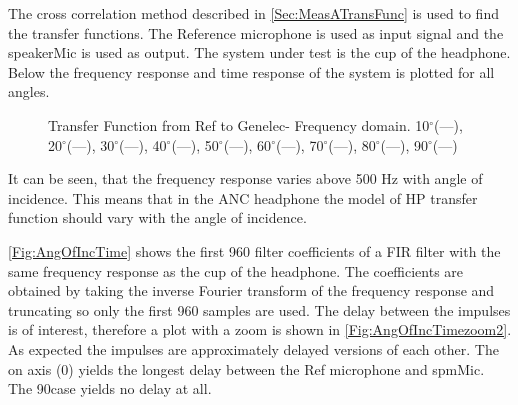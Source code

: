 The cross correlation method described in \autoref{Sec:MeasATransFunc} is used to find the transfer functions. The Reference microphone is used as input signal and the speakerMic is used as output. The system under test is the cup of the headphone. 
Below the frequency response and time response of the system is plotted for all angles. 
\begin{figure}[H]
	
	\caption{Transfer Function from Ref to Genelec- Frequency domain. 10$^\circ$(\textcolor{MATLABblue}{---}), 
	20$^\circ$(\textcolor{MATLABorange}{---}), 	
	30$^\circ$(\textcolor{MATLAByellow}{---}), 	
	40$^\circ$(\textcolor{MATLABpurple}{---}), 	
	50$^\circ$(\textcolor{MATLABgreen}{---}), 	
	60$^\circ$(\textcolor{MATLABbabyblue}{---}), 	
	70$^\circ$(\textcolor{MATLABred}{---}), 	
	80$^\circ$(\textcolor{MATLABblue}{---}), 	
	90$^\circ$(\textcolor{MATLABorange}{---})			
		}
	\label{Fig:AngOfIncFreq}
\end{figure}
It can be seen, that the frequency response varies above 500 Hz with angle of incidence. This means that in the ANC headphone the model of HP transfer function should vary with the angle of incidence.  


\autoref{Fig:AngOfIncTime} shows the first 960 filter coefficients of a FIR filter with the same frequency response as the cup of the headphone. The coefficients are obtained by taking the inverse Fourier transform of the frequency response and truncating so only the first 960 samples are used.   The delay between the impulses is of interest, therefore a plot with a zoom is shown in \autoref{Fig:AngOfIncTimezoom2}.
As expected the impulses are approximately delayed versions of each other. The on axis (0\degrees) yields the longest delay between the Ref microphone and spmMic. The 90\degrees case yields no delay at all. 


